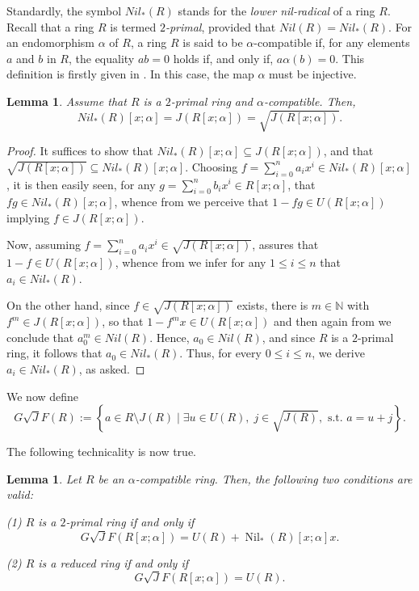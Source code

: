 \documentclass[12pt]{amsart}
\newtheorem{lemma}[theorem]{Lemma}
\theoremstyle{definition}
\begin{document}
Standardly, the symbol $Nil_*(R)$ stands for the \textit{lower nil-radical} of a ring $R$. Recall
that a ring $R$ is termed \textit{$2$-primal}, provided that $Nil(R)=Nil_*(R)$. For an endomorphism $\alpha$ of $R$, a ring $R$ is said to be $\alpha$-compatible if, for any elements $a$ and $b$ in $R$, the equality $ab = 0$ holds if, and only if, $a\alpha(b) = 0$. This definition is firstly given in \cite{amin}. In this case, the map $\alpha$ must be injective.

\begin{lemma}\label{fi}
Assume that $R$ is a $2$-primal ring and $\alpha$-compatible. Then,
\[
Nil_*(R)[x; \alpha] = J(R[x; \alpha]) = \sqrt{J(R[x; \alpha])}.
\]
\end{lemma}

\begin{proof}
It suffices to show that $Nil_*(R)[x; \alpha] \subseteq J(R[x; \alpha])$, and that $\sqrt{J(R[x; \alpha])} \subseteq Nil_*(R)[x; \alpha]$. Choosing $f=\sum_{i=0}^{n}a_ix^i \in Nil_*(R)[x; \alpha]$, it is then easily seen, for any $g=\sum_{i=0}^{n}b_ix^i \in R[x; \alpha]$, that $fg \in Nil_*(R)[x; \alpha]$, whence from \cite[Lemma 2.1]{che} we perceive that $1-fg \in U(R[x; \alpha])$ implying $f \in J(R[x; \alpha])$.

Now, assuming $f=\sum_{i=0}^{n}a_ix^i \in \sqrt{J(R[x; \alpha])}$, \cite[Lemma 2.1(3)]{DDE} assures that $1-f \in U(R[x; \alpha])$, whence from \cite[Lemma 2.1]{che} we infer for any $1\le i \le n$ that $a_i \in Nil_*(R)$. 

On the other hand, since $f \in \sqrt{J(R[x; \alpha])}$ exists, there is $m \in \mathbb{N}$ with $f^m \in J(R[x; \alpha])$, so that $1-f^m x \in U(R[x; \alpha])$ and then again from \cite[Lemma 2.1]{che} we conclude that $a_0^m \in Nil(R)$. Hence, $a_0 \in Nil(R)$, and since $R$ is a $2$-primal ring, it follows that $a_0 \in Nil_*(R)$. Thus, for every $0 \le i \le n$, we derive $a_i \in Nil_*(R)$, as asked.
\end{proof}

We now define
\[
G\sqrt{J}F(R):=\left\{ a \in R \setminus J(R) \mid \exists u \in U(R),\; j \in \sqrt{J(R)},\text{ s.t. } a=u+j  \right\}.
\]

The following technicality is now true.

\begin{lemma}
Let $R$ be an $\alpha$-compatible ring. Then, the following two conditions are valid:

(1) $R$ is a $2$-primal ring if and only if $$G\sqrt{J}F(R[x; \alpha])=U(R)+\operatorname{Nil}_*(R)[x; \alpha]x.$$

(2) $R$ is a reduced ring if and only if $$G\sqrt{J}F(R[x; \alpha])=U(R).$$
\end{lemma}
\end{document}
